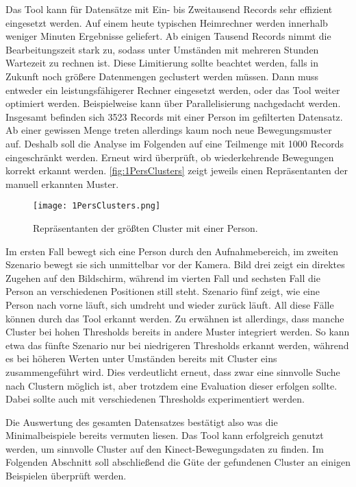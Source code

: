 Das Tool kann für Datensätze mit Ein- bis Zweitausend Records sehr effizient eingesetzt werden.
Auf einem heute typischen Heimrechner werden innerhalb weniger Minuten Ergebnisse geliefert.
Ab einigen Tausend Records nimmt die Bearbeitungszeit stark zu,
sodass unter Umständen mit mehreren Stunden Wartezeit zu rechnen ist.
Diese Limitierung sollte beachtet werden,
falls in Zukunft noch größere Datenmengen geclustert werden müssen.
Dann muss entweder ein leistungsfähigerer Rechner eingesetzt werden,
oder das Tool weiter optimiert werden.
Beispielweise kann über Parallelisierung nachgedacht werden.
Insgesamt befinden sich 3523 Records mit einer Person im gefilterten Datensatz.
Ab einer gewissen Menge treten allerdings kaum noch neue Bewegungsmuster auf.
Deshalb soll die Analyse im Folgenden auf eine Teilmenge mit 1000 Records eingeschränkt werden.
Erneut wird überprüft, ob wiederkehrende Bewegungen korrekt erkannt werden.
\autoref{fig:1PersClusters} zeigt jeweils einen Repräsentanten der manuell erkannten Muster.
\begin{figure}[ht]
    \begin{center}
    \texttt{[image: 1PersClusters.png]}
    \end{center}
    \caption{Repräsentanten der größten Cluster mit einer Person.}
    \label{fig:1PersClusters}
\end{figure}
Im ersten Fall bewegt sich eine Person durch den Aufnahmebereich,
im zweiten Szenario bewegt sie sich unmittelbar vor der Kamera.
Bild drei zeigt ein direktes Zugehen auf den Bildschirm,
während im vierten Fall und sechsten Fall die Person an verschiedenen Positionen still steht.
Szenario fünf zeigt, wie eine Person nach vorne läuft,
sich umdreht und wieder zurück läuft.
All diese Fälle können durch das Tool erkannt werden.
Zu erwähnen ist allerdings, dass manche Cluster bei hohen Thresholds bereits in andere Muster integriert werden.
So kann etwa das fünfte Szenario nur bei niedrigeren Thresholds erkannt werden,
während es bei höheren Werten unter Umständen bereits mit Cluster eins zusammengeführt wird.
Dies verdeutlicht erneut, dass zwar eine sinnvolle Suche nach Clustern möglich ist,
aber trotzdem eine Evaluation dieser erfolgen sollte.
Dabei sollte auch mit verschiedenen Thresholds experimentiert werden.

Die Auswertung des gesamten Datensatzes bestätigt also was die Minimalbeispiele bereits vermuten liesen.
Das Tool kann erfolgreich genutzt werden, um sinnvolle Cluster auf den Kinect-Bewegungsdaten zu finden.
Im Folgenden Abschnitt soll abschließend die Güte der gefundenen Cluster an einigen Beispielen
überprüft werden.

